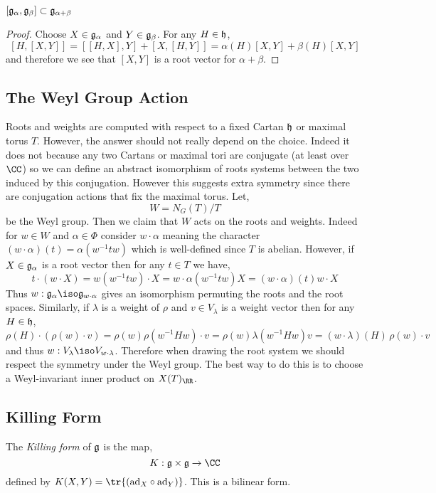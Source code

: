 \documentclass[12pt]{article}
\begin{document}
\begin{lemma}
$[\mathfrak{g}_\alpha, \mathfrak{g}_\beta] \subset \mathfrak{g}_{\alpha + \beta}$
\end{lemma}

\begin{proof}
Choose $X \in \mathfrak{g}_\alpha$ and $Y \in \mathfrak{g}_{\beta}$. For any $H \in \mathfrak{h}$,
\[ [H, [X,Y]] = [[H,X],Y] + [X, [H,Y]] = \alpha(H) [X,Y] + \beta(H) [X, Y] \]
and therefore we see that $[X,Y]$ is a root vector for $\alpha + \beta$.
\end{proof}

\subsection{The Weyl Group Action}

Roots and weights are computed with respect to a fixed Cartan $\mathfrak{h}$ or maximal torus $T$. However, the answer should not really depend on the choice. Indeed it does not because any two Cartans or maximal tori are conjugate (at least over $\CC$) so we can define an abstract isomorphism of roots systems between the two induced by this conjugation. However this suggests extra symmetry since there are conjugation actions that fix the maximal torus. Let,
\[ W = N_G(T)/T \]
be the Weyl group. Then we claim that $W$ acts on the roots and weights. Indeed for $w \in W$ and $\alpha \in \Phi$ consider $w \cdot \alpha$ meaning the character $(w \cdot \alpha)(t) = \alpha(w^{-1} t w)$ which is well-defined since $T$ is abelian. However, if $X \in \mathfrak{g}_{\alpha}$ is a root vector then for any $t \in T$ we have,
\[ t \cdot (w \cdot X) = w (w^{-1} t w) \cdot X = w \cdot \alpha(w^{-1} t w) X = (w \cdot \alpha)(t) w \cdot X \]
Thus $w : \g_{\alpha} \iso \g_{w \cdot \alpha}$ gives an isomorphism permuting the roots and the root spaces. Similarly, if $\lambda$ is a weight of $\rho$ and $v \in V_\lambda$ is a weight vector then for any $H \in \mathfrak{h}$,
\[ \rho(H) \cdot (\rho(w) \cdot v) = \rho(w) \rho(w^{-1} H w) \cdot v = \rho(w) \lambda(w^{-1} H w) v = (w \cdot \lambda)(H) \, \rho(w) \cdot v \]
and thus $w : V_\lambda \iso V_{w \cdot \lambda}$. Therefore when drawing the root system we should respect the symmetry under the Weyl group. The best way to do this is to choose a Weyl-invariant inner product on $X(T)_{\RR}$.  

\subsection{Killing Form}

\begin{defn}
The \textit{Killing form} of $\mathfrak{g}$ is the map,
\[ K : \g \times \g \to \CC \]
defined by $K(X,Y) = \tr{(\ad_X \circ \ad_Y)}$. This is a bilinear form. 
\end{defn}
\end{document}
